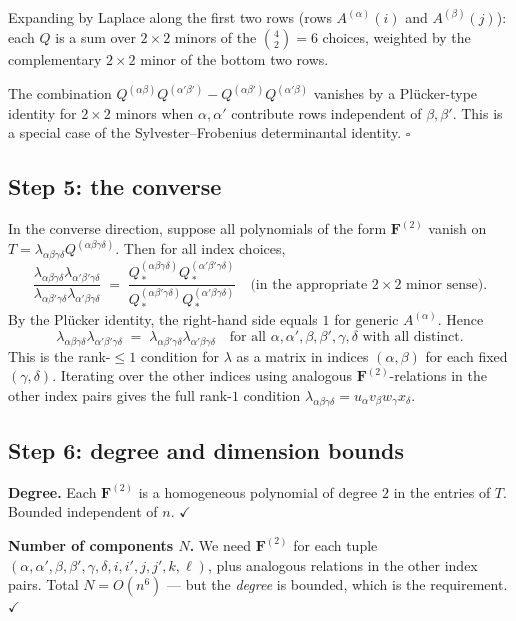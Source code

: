 Expanding by Laplace along the first two rows (rows $A^{(\alpha)}(i)$ and $A^{(\beta)}(j)$): each $Q$ is a sum over $2\times 2$ minors of the $\binom{4}{2}=6$ choices, weighted by the complementary $2\times 2$ minor of the bottom two rows.

The combination $Q^{(\alpha\beta)}Q^{(\alpha'\beta')}-Q^{(\alpha\beta')}Q^{(\alpha'\beta)}$ vanishes by a Plücker-type identity for $2\times 2$ minors when $\alpha,\alpha'$ contribute rows independent of $\beta,\beta'$.  This is a special case of the Sylvester--Frobenius determinantal identity.  $\square$

\subsection*{Step 5: the converse}

In the converse direction, suppose all polynomials of the form $\mathbf F^{(2)}$ vanish on $T=\lambda_{\alpha\beta\gamma\delta}Q^{(\alpha\beta\gamma\delta)}$.  Then for all index choices,
\[
\frac{\lambda_{\alpha\beta\gamma\delta}\lambda_{\alpha'\beta'\gamma\delta}}{\lambda_{\alpha\beta'\gamma\delta}\lambda_{\alpha'\beta\gamma\delta}} \;=\; \frac{Q^{(\alpha\beta\gamma\delta)}_{\,*}Q^{(\alpha'\beta'\gamma\delta)}_{\,*}}{Q^{(\alpha\beta'\gamma\delta)}_{\,*}Q^{(\alpha'\beta\gamma\delta)}_{\,*}}\quad\text{(in the appropriate $2\times 2$ minor sense)}.
\]
By the Plücker identity, the right-hand side equals $1$ for generic $A^{(\alpha)}$.  Hence
\[
\lambda_{\alpha\beta\gamma\delta}\lambda_{\alpha'\beta'\gamma\delta} \;=\; \lambda_{\alpha\beta'\gamma\delta}\lambda_{\alpha'\beta\gamma\delta}\quad\text{for all }\alpha,\alpha',\beta,\beta',\gamma,\delta\text{ with all distinct}.
\]
This is the rank-$\le 1$ condition for $\lambda$ as a matrix in indices $(\alpha,\beta)$ for each fixed $(\gamma,\delta)$.  Iterating over the other indices using analogous $\mathbf F^{(2)}$-relations in the other index pairs gives the full rank-$1$ condition $\lambda_{\alpha\beta\gamma\delta}=u_\alpha v_\beta w_\gamma x_\delta$.

\subsection*{Step 6: degree and dimension bounds}

\textbf{Degree.}  Each $\mathbf F^{(2)}$ is a homogeneous polynomial of degree $2$ in the entries of $T$.  Bounded independent of $n$.  $\checkmark$

\textbf{Number of components $N$.}  We need $\mathbf F^{(2)}$ for each tuple $(\alpha,\alpha',\beta,\beta',\gamma,\delta,i,i',j,j',k,\ell)$, plus analogous relations in the other index pairs.  Total $N=O(n^6)$ — but the \emph{degree} is bounded, which is the requirement.  $\checkmark$

